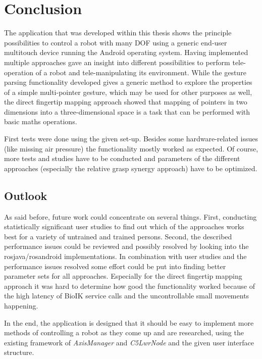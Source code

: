 \chapter{Conclusion}
\label{chap:concl}

The application that was developed within this thesis shows the principle possibilities to control a robot with many DOF using a generic end-user multitouch device running the Android operating system. Having implemented multiple approaches gave an insight into different possibilities to perform tele-operation of a robot and  tele-manipulating its environment. While the gesture parsing functionality developed gives a generic method to explore the properties of a simple multi-pointer gesture, which may be used for other purposes as well, the direct fingertip mapping approach showed that mapping of pointers in two dimensions into a three-dimensional space is a task that can be performed with basic maths operations.

First tests were done using the given set-up. Besides some hardware-related issues (like missing air pressure) the functionality mostly worked as expected. Of course, more tests and studies have to be conducted and parameters of the different approaches (especially the relative grasp synergy approach) have to be optimized.

\section{Outlook}

As said before, future work could concentrate on several things. First, conducting statistically significant user studies to find out which of the approaches works best for a variety of untrained and trained persons. Second, the described performance issues could be reviewed and possibly resolved by looking into the rosjava/rosandroid implementations. In combination with user studies and the performance issues resolved some effort could be put into finding better parameter sets for all approaches. Especially for the direct fingertip mapping approach it was hard to determine how good the functionality worked because of the high latency of BioIK service calls and the uncontrollable small movements happening.

In the end, the application is designed that it should be easy to implement more methods of controlling a robot as they come up and are researched, using the existing framework of \textit{AxisManager} and \textit{C5LwrNode} and the given user interface structure.